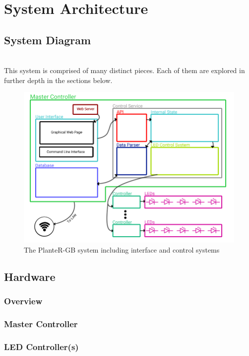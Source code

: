\documentclass[onecolumn, draftclsnofoot,10pt, compsoc]{IEEEtran}
\begin{document}
	\section{System Architecture}
		\subsection{System Diagram}

		\noindent \\This system is comprised of many distinct pieces. Each of them are explored in further depth in the sections below.

		\begin{center}
			\begin{figure}[H]
				\includegraphics[width=\linewidth]{systemDiagrams/systemdiag.png}
				\caption{The PlanteR-GB system including interface and control systems}
				\label{fig:systemDiagram}
			\end{figure}
		\end{center}

		\subsection{Hardware}
			\subsubsection{Overview}
			\subsubsection{Master Controller}
			\subsubsection{LED Controller(s)}
\end{document}
